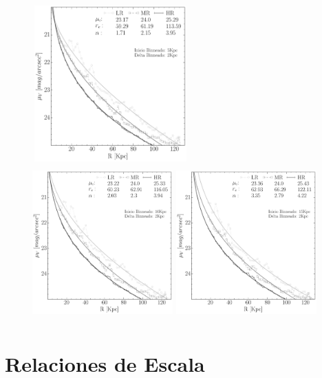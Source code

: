 \begin{figure}[H]
  \hspace*{-1.4cm}\includegraphics[height=6cm, width=6cm,trim={0cm   0.cm 0.cm 0.cm},clip ]{../al_final/resoluciones/res1.pdf}
  \hspace*{.1cm}\includegraphics[height=6cm, width=5.4cm ,trim={2.3cm  0.cm 0.cm 0.cm},clip ]{../al_final/resoluciones/res2.pdf}
  \hspace*{.1cm}\includegraphics[height=6cm, width=5.4cm ,trim={2.3cm  0.cm 0.cm 0.cm},clip ]{../al_final/resoluciones/res3.pdf}
\end{figure}

\section{Relaciones de Escala}



